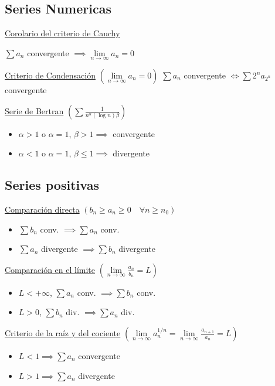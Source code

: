 \documentclass[12pt]{article}
\begin{document}
\raggedright
\begin{multicols}{3}

\section{Series Numericas}

\underline{Corolario del criterio de Cauchy}

$\sum a_n$ convergente $\implies \lim\limits_{n \to \infty} a_n = 0$

\underline{Criterio de Condensación} $\left( \lim\limits_{n \to \infty} a_n = 0 \right)$
$\sum a_n$ convergente $\iff \sum 2^na_{2^n}$ convergente

\underline{Serie de Bertran}
$\left( \sum \frac{1}{n^\alpha (\log{n}) \beta} \right)$
\begin{itemize}
	\item $\alpha > 1$ o $\alpha = 1$, $\beta > 1 \implies$ convergente
	\item $\alpha < 1$ o $\alpha = 1$, $\beta \leq 1 \implies$ divergente
\end{itemize}

\subsection{Series positivas}

\underline{Comparación directa} $\left( b_n \geq a_n \geq 0 \quad \forall n \geq n_0 \right)$
\begin{itemize}
	\item $\sum b_n$ conv. $\implies \sum a_n$ conv.
	\item $\sum a_n$ divergente $\implies \sum b_n$ divergente
\end{itemize}

\underline{Comparación en el límite} $\left(\lim\limits_{n \to \infty} \frac{a_n}{b_n} = L
\right)$
\begin{itemize}
	\item $L < +\infty$, $\sum a_n$ conv. $\implies \sum b_n$ conv. \\
	\item $L > 0$, $\sum b_n$ div. $\implies \sum a_n$ div.
\end{itemize}

\underline{Criterio de la raíz y del cociente}
$\left(\lim\limits_{n \to \infty} a_n^{1/n} =
\lim\limits_{n \to \infty} \frac{a_{n+1}}{a_n} = L \right)$
\begin{itemize}
	\item $L < 1 \implies \sum a_n$ convergente
	\item $L > 1 \implies \sum a_n$ divergente
\end{itemize}


\end{multicols}
\end{document}

